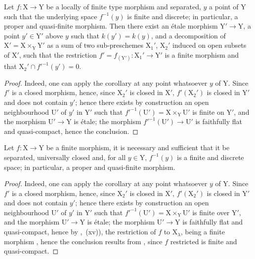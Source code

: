 \begin{corollary}[18.12.3]
\label{IV.18.12.3}
Let $f:\mathrm{X}\to\mathrm{Y}$ be a locally of finite type morphism and separated, $y$ a point of $\mathrm{Y}$ such that the underlying space $f^{-1}(y)$ is finite and discrete; in particular, a proper and quasi-finite morphism.
Then there exist an \'etale morphism $\mathrm{Y}'\to\mathrm{Y}$, a point $y'\in\mathrm{Y}'$ above $y$ such that $k(y')=k(y)$, and a decomposition of $\mathrm{X}'=\mathrm{X}\times_{\mathrm{Y}}\mathrm{Y}'$ as a sum of two sub-preschemes $\mathrm{X}_1'$, $\mathrm{X}_2'$ induced on open subsets of $\mathrm{X}'$, such that the restriction $f'=f_{(\mathrm{Y}')}:\mathrm{X}_1'\to\mathrm{Y}'$ is a finite morphism and that $\mathrm{X}_2'\cap f'^{-1}(y')=0$.
\end{corollary}

\begin{proof}
Indeed, one can apply the corollary  at any point whatsoever $y$ of $\mathrm{Y}$.
Since $f'$ is a closed morphism, hence, since $\mathrm{X}_2'$ is closed in $\mathrm{X}'$, $f'(\mathrm{X}_2')$ is closed in $\mathrm{Y}'$ and does not contain $y'$; hence there exists by construction an open neighbourhood $\mathrm{U}'$ of $y'$ in $\mathrm{Y}'$ such that $f'^{-1}(\mathrm{U}')=\mathrm{X}\times_\mathrm{Y}\mathrm{U}'$ is finite on $\mathrm{Y}'$, and the morphism $\mathrm{U}'\to\mathrm{Y}$ is \'etale; the morphism $f'^{-1}(\mathrm{U}')\to\mathrm{U}'$ is faithfully flat and quasi-compact, hence the conclusion.
\end{proof}

\begin{corollary}[18.12.4]
\label{IV.18.12.4}
Let $f:\mathrm{X}\to\mathrm{Y}$ be a finite morphism, it is necessary and sufficient that it be separated, universally closed and, for all $y\in\mathrm{Y}$, $f^{-1}(y)$ is a finite and discrete space; in particular, a proper and quasi-finite morphism.
\end{corollary}

\begin{proof}
Indeed, one can apply the corollary  at any point whatsoever $y$ of $\mathrm{Y}$.
Since $f'$ is a closed morphism, hence, since $\mathrm{X}_2'$ is closed in $\mathrm{X}'$, $f'(\mathrm{X}_2')$ is closed in $\mathrm{Y}'$ and does not contain $y'$; hence there exists by construction an open neighbourhood $\mathrm{U}'$ of $y'$ in $\mathrm{Y}'$ such that $f'^{-1}(\mathrm{U}')=\mathrm{X}\times_\mathrm{Y}\mathrm{U}'$ is finite over $\mathrm{Y}'$, and the morphism $\mathrm{U}'\to\mathrm{Y}$ is \'etale; the morphism $\mathrm{U}'\to\mathrm{Y}$ is faithfully flat and quasi-compact, hence by ,~(xv)), the restriction of $f$ to $\mathrm{X}_\lambda$, being a finite morphism , hence the conclusion results from , since $f$ restricted is finite and quasi-compact.
\end{proof}

